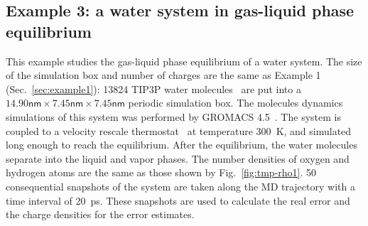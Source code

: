 \documentclass[aps,pre,preprint,unsortedaddress]{revtex4}
\begin{document}



\subsection{Example 3: a water system in gas-liquid phase equilibrium}
\label{sec:example3}

This example studies the gas-liquid phase equilibrium of a water
system. The size of the simulation box and number of charges are the
same as Example 1 (Sec.~\ref{sec:example1}): 13824 TIP3P water
molecules~\cite{jorgensen1983comparison} are put into a
$14.90\textsf{nm}\times 7.45\textsf{nm}\times 7.45\textsf{nm}$
periodic simulation box.  The molecules dynamics simulations of this
system was performed by GROMACS 4.5~\cite{hess2008gromacs}.  The system
is coupled to a velocity rescale thermostat~\cite{bussi2007canonical}
at temperature 300~\textsf{K}, and simulated long enough to reach the
equilibrium. After the equilibrium,
the water molecules separate into the liquid and vapor phases.
The number densities of oxygen and hydrogen atoms
are the same as those shown by Fig.~\ref{fig:tmp-rho1}.
50 consequential snapshots of
the system are taken along the MD trajectory
with a time interval of 20~\textsf{ps}.  These
snapshots are used to calculate the real error and the charge densities
for the error estimates.
\end{document}
